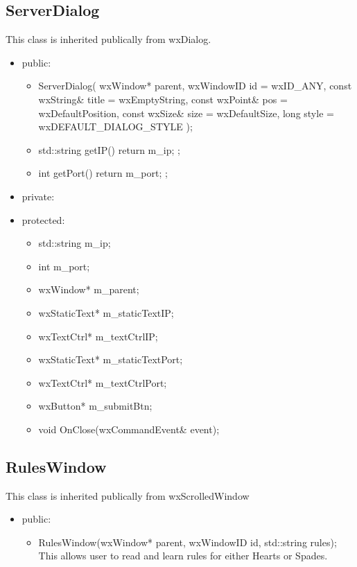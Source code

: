 \documentclass[]{scrartcl}
\begin{document}
 \subsection{ServerDialog }
 	This class is inherited publically from wxDialog.
 	\begin{itemize}
 	\item public:

 	\begin{itemize}
 		\item ServerDialog( wxWindow* parent, wxWindowID id = wxID\_ANY, const wxString\& title = wxEmptyString, const wxPoint\& pos = wxDefaultPosition, const wxSize\& size = wxDefaultSize, long style = wxDEFAULT\_DIALOG\_STYLE );

 		\item std::string getIP() { return m\_ip; };

 		\item int getPort() { return m\_port; };
 	\end{itemize}

 	\item private:
 	\item protected:
 		\begin{itemize}
 			\item std::string m\_ip;
 			\item	int m\_port;
 			\item	wxWindow* m\_parent;
 			\item	wxStaticText* m\_staticTextIP;
 			\item	wxTextCtrl* m\_textCtrlIP;
 			\item	wxStaticText* m\_staticTextPort;
 			\item	wxTextCtrl* m\_textCtrlPort;
 			\item	wxButton* m\_submitBtn;
 			\item	void OnClose(wxCommandEvent\& event);
 		\end{itemize}
 	\end{itemize}

 \subsection{RulesWindow }
 	This class is inherited  publically from wxScrolledWindow

 	\begin{itemize}
 		\item 	public:
 		\begin{itemize}
 			\item RulesWindow(wxWindow* parent, wxWindowID id, std::string rules);
 				\\This allows user to read and learn rules for either Hearts or Spades.
 		\end{itemize}
 	\end{itemize}
\end{document}
